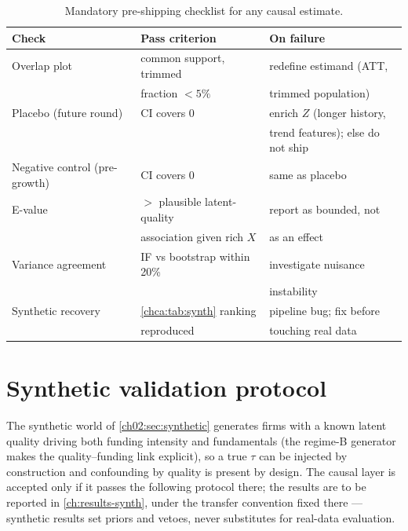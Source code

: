 \begin{table}[htbp]
\centering
\caption{Mandatory pre-shipping checklist for any causal estimate.}
\label{chca:tab:checklist}
\small
\begin{tabular}{@{}lll@{}}
\toprule
Check & Pass criterion & On failure \\
\midrule
Overlap plot & common support, trimmed & redefine estimand (ATT, \\
 & fraction $< 5\%$ & trimmed population) \\
Placebo (future round) & CI covers 0 & enrich $Z$ (longer history, \\
 & & trend features); else do not ship \\
Negative control (pre-growth) & CI covers 0 & same as placebo \\
E-value & $>$ plausible latent-quality & report as bounded, not \\
 & association given rich $X$ & as an effect \\
Variance agreement & IF vs bootstrap within 20\% & investigate
nuisance \\
 & & instability \\
Synthetic recovery & \cref{chca:tab:synth} ranking & pipeline bug; fix
before \\
 & reproduced & touching real data \\
\bottomrule
\end{tabular}
\end{table}

\section{Synthetic validation protocol}\label{chca:sec:synth}

The synthetic world of \cref{ch02:sec:synthetic} generates firms with a known latent quality
driving both funding intensity and fundamentals (the regime-B generator makes the
quality--funding link explicit), so a true $\tau$ can be injected by construction and
confounding by quality is present by design. The causal layer is accepted only if it passes the
following protocol there; the results are to be reported in \cref{ch:results-synth}, under the
transfer convention fixed there --- synthetic results set priors and vetoes, never substitutes
for real-data evaluation.

